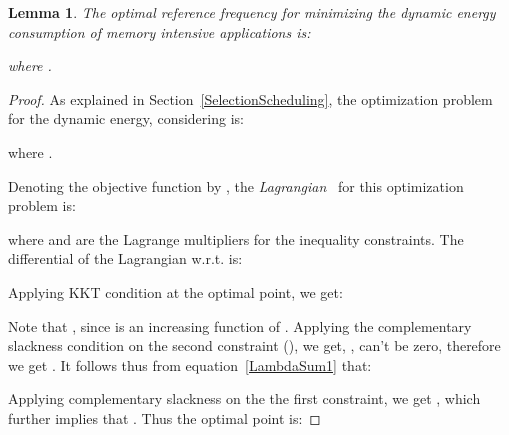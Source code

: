 \documentclass[11pt, letterpaper]{article}
\newtheorem{lemma}{Lemma}
\begin{document}
\begin{lemma}\label{DynamicOptimizer}
The optimal reference frequency for minimizing the dynamic energy consumption of memory intensive applications  is:

where .
\end{lemma}
\begin{proof}
As explained in Section~\ref{SelectionScheduling}, the optimization problem for the dynamic energy, considering  is:


where .

Denoting the objective function by , the \emph{Lagrangian}~\cite{Boyd} for this optimization problem is:


where  and  are the Lagrange multipliers for the inequality constraints.
The differential of the Lagrangian w.r.t.  is:

Applying KKT condition   at the optimal point, we get:

Note that , since  is an increasing function of .
Applying the complementary slackness condition on the second constraint (), we get, ,  can't be zero, therefore we get  . It follows thus from equation~\ref{LambdaSum1}  that:

Applying complementary slackness on the the first constraint, we get , which further implies that .
Thus the optimal point is:

\end{proof}
\end{document}
